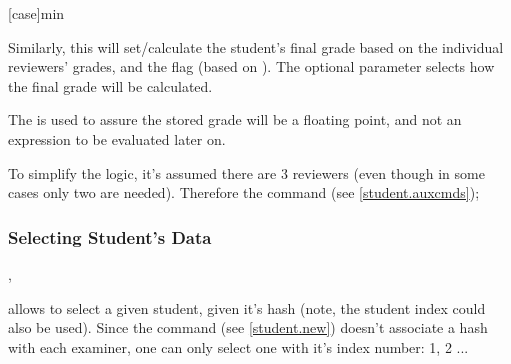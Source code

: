 \documentclass[10pt]{article}
\begin{document}



\begin{codedescribe}{\studentgrade}
\begin{codesyntax}
  \tsmacro{\studentgrade}[case]{min}
\end{codesyntax}  
Similarly, this will set/calculate the student's final grade based on the individual reviewers' grades, and the flag  (based on ).  The optional parameter  selects how the final grade will be calculated.
\begin{tsremark}
  The  is used to assure the stored grade will be a floating point, and not an expression to be evaluated later on.
\end{tsremark}
\begin{tsremark}
  To simplify the logic, it's assumed there are 3 reviewers (even though in some cases only two are needed). Therefore the command \tsobj{\emptytermifnone} (see \ref{student.auxcmds});
\end{tsremark}
\end{codedescribe}



\subsubsection{Selecting Student's Data}\label{student.data-recovery}

\begin{codedescribe}{\studentselect,\studentReviewerSelect}
\begin{codesyntax}
\end{codesyntax}
 \tsobj{\studentselect} allows to select a given student, given it's hash (note, the student index could also be used). Since the \tsobj{\examiner} command (see \ref{student.new}) doesn't associate a hash with each examiner, one can only select one with it's index number: 1, 2 ...
\end{codedescribe}

\end{document}
